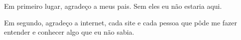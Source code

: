 \begin{agradecimentos}
Em primeiro lugar, agradeço a meus pais. Sem eles eu não estaria aqui.

Em segundo, agradeço a internet, cada site e cada pessoa que pôde me fazer
entender e conhecer algo que eu não sabia.
\end{agradecimentos}
